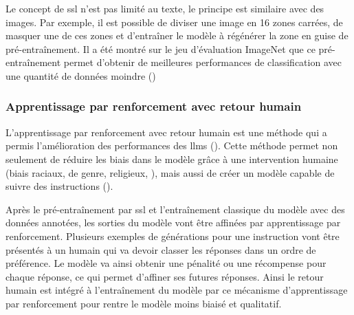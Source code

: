 Le concept de \gls{ssl} n'est pas limité au texte, le principe est similaire avec des images. Par exemple, il est possible de diviser une image en 16 zones carrées, de masquer une de ces zones et d'entraîner le modèle à régénérer la zone en guise de pré-entraînement. Il a été montré sur le jeu d'évaluation ImageNet que ce pré-entraînement permet d'obtenir de meilleures performances de classification avec une quantité de données moindre (\cite{goyal_self-supervised_2021})

\subsubsection{Apprentissage par renforcement avec retour humain}
L'apprentissage par renforcement avec retour humain est une méthode qui a permis l'amélioration des performances des \gls{llms} (\cite{ziegler_fine-tuning_2020, stiennon_learning_2020}). Cette méthode permet non seulement de réduire les biais dans le modèle grâce à une intervention humaine (biais raciaux, de genre, religieux, \cite{ganguli_red_2022}), mais aussi de créer un modèle capable de suivre des instructions (\cite{ouyang_training_2022}).


Après le pré-entraînement par \gls{ssl} et l'entraînement classique du modèle avec des données annotées, les sorties du modèle vont être affinées par apprentissage par renforcement. Plusieurs exemples de générations pour une instruction vont être présentés à un humain qui va devoir classer les réponses dans un ordre de préférence. Le modèle va ainsi obtenir une pénalité ou une récompense pour chaque réponse, ce qui permet d'affiner ses futures réponses. Ainsi le retour humain est intégré à l'entraînement du modèle par ce mécanisme d'apprentissage par renforcement pour rentre le modèle moins biaisé et qualitatif.

